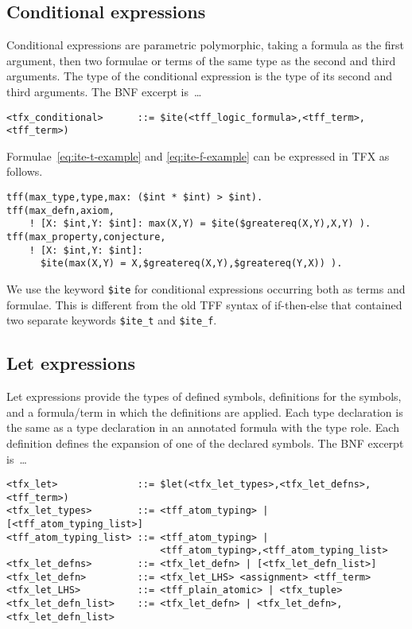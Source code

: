 \documentclass{easychair}
\begin{document}
\subsection{Conditional expressions}

Conditional expressions are parametric polymorphic, taking a formula as the 
first argument, then two formulae or terms of the same type as the second and 
third arguments. The type of the conditional expression is the type of its second and third arguments. The BNF excerpt is~\ldots
\begin{verbatim}
<tfx_conditional>      ::= $ite(<tff_logic_formula>,<tff_term>,<tff_term>)
\end{verbatim}

Formulae~\ref{eq:ite-t-example} and \ref{eq:ite-f-example} can be expressed in
TFX as follows.
\begin{verbatim}
tff(max_type,type,max: ($int * $int) > $int).
tff(max_defn,axiom,
    ! [X: $int,Y: $int]: max(X,Y) = $ite($greatereq(X,Y),X,Y) ).
tff(max_property,conjecture,
    ! [X: $int,Y: $int]: 
      $ite(max(X,Y) = X,$greatereq(X,Y),$greatereq(Y,X)) ).
\end{verbatim}

We use the keyword \verb'$ite' for conditional expressions occurring both as
terms and formulae. This is different from the old TFF syntax of if-then-else
that contained two separate keywords \verb'$ite_t' and \verb'$ite_f'.

\subsection{Let expressions}

Let expressions provide the types of defined symbols, definitions for the 
symbols, and a formula/term in which the definitions are applied. 
Each type declaration is the same as a type declaration in an annotated 
formula with the type role.
Each definition defines the expansion of one of the declared symbols.
The BNF excerpt is~\ldots
\begin{verbatim}
<tfx_let>              ::= $let(<tfx_let_types>,<tfx_let_defns>,<tff_term>)
<tfx_let_types>        ::= <tff_atom_typing> | [<tff_atom_typing_list>]
<tff_atom_typing_list> ::= <tff_atom_typing> |
                           <tff_atom_typing>,<tff_atom_typing_list>
<tfx_let_defns>        ::= <tfx_let_defn> | [<tfx_let_defn_list>]
<tfx_let_defn>         ::= <tfx_let_LHS> <assignment> <tff_term>
<tfx_let_LHS>          ::= <tff_plain_atomic> | <tfx_tuple>
<tfx_let_defn_list>    ::= <tfx_let_defn> | <tfx_let_defn>,<tfx_let_defn_list>
\end{verbatim}
\end{document}
